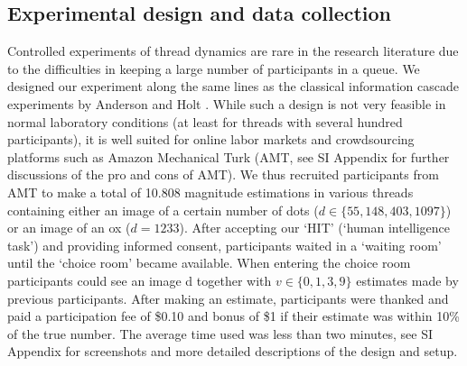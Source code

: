 \documentclass[10pt,a4paper,twocolumn,lineno]{article}
\begin{document}
\subsection*{Experimental design and data collection} Controlled experiments of thread dynamics are rare in the research literature due to the difficulties in keeping a large number of participants in a queue. We designed our experiment along the same lines as the classical information cascade experiments by Anderson and Holt \cite{anderson1997information}. While such a design is not very feasible in normal laboratory conditions (at least for threads with several hundred participants), it is well suited for online labor markets and crowdsourcing platforms such as Amazon Mechanical Turk (AMT, see SI Appendix for further discussions of the pro and cons of AMT). We thus recruited participants from AMT to make a total of 10.808 magnitude estimations in various threads containing either an image of a certain number of dots ($d \in \{55,148,403,1097\}$) or an image of an ox ($d=1233$). After accepting our ‘HIT’ (‘human intelligence task’) and providing informed consent, participants waited in a ‘waiting room’ until the ‘choice room’ became available. When entering the choice room participants could see an image d together with $v \in \{0,1,3,9\}$ estimates made by previous participants. After making an estimate, participants were thanked and paid a participation fee of \$0.10 and bonus of \$1 if their estimate was within 10\% of the true number. The average time used was less than two minutes, see SI Appendix for screenshots and more detailed descriptions of the design and setup.
\end{document}
